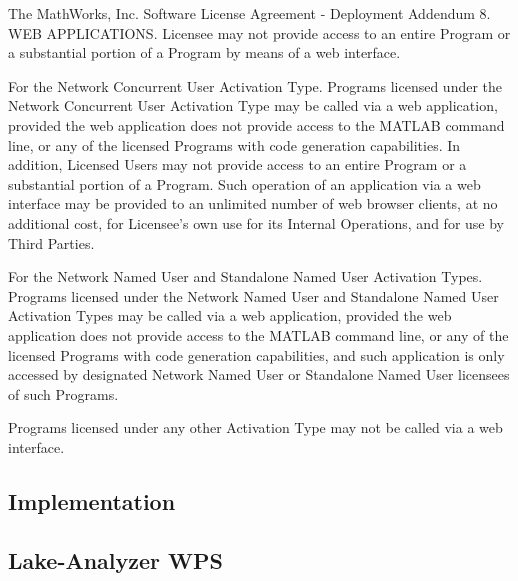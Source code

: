 		\begin{signedquote}{The MathWorks, Inc. Software License Agreement - Deployment Addendum}
			8. WEB APPLICATIONS.  Licensee may not provide access to an entire Program
			or a substantial portion of a Program by means of a web interface.

			For the Network Concurrent User Activation Type.  Programs licensed under the
			Network Concurrent User Activation Type may be called via a web application,
			provided the web application does not provide access to the MATLAB command
			line, or any of the licensed Programs with code generation capabilities.  In
			addition, Licensed Users may not provide access to an entire Program or a
			substantial portion of a Program.  Such operation of an application via a web
			interface may be provided to an unlimited number of web browser clients, at no
			additional cost, for Licensee's own use for its Internal Operations, and for
			use by Third Parties.

			For the Network Named User and Standalone Named User Activation Types.
			Programs licensed under the Network Named User and Standalone Named User
			Activation Types may be called via a web application, provided the web
			application does not provide access to the MATLAB command line, or any of the
			licensed Programs with code generation capabilities, and such application is
			only accessed by designated Network Named User or Standalone Named User
			licensees of such Programs.

			Programs licensed under any other Activation Type may not be called via a web
			interface.
		\end{signedquote}

	\subsection{Implementation}

	\subsection{Lake-Analyzer WPS}
